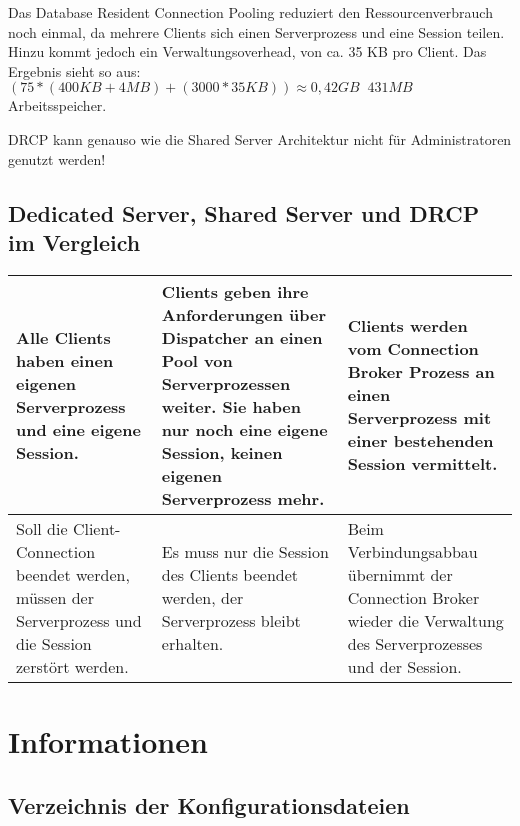           Das Database Resident Connection Pooling reduziert den Ressourcenverbrauch noch einmal, da mehrere Clients sich einen Serverprozess und eine Session teilen. Hinzu kommt jedoch ein Verwaltungsoverhead, von ca. 35 KB pro Client. Das Ergebnis sieht so aus: $(75 * (400 KB + 4 MB) + (3000 * 35 KB)) \approx 0,42 GB \mathop{\widehat{=}} 431 MB$ Arbeitsspeicher.

          \begin{merke}
            DRCP kann genauso wie die Shared Server Architektur nicht f\"ur Administratoren genutzt werden!
          \end{merke}

      \subsection{Dedicated Server, Shared Server und DRCP im Vergleich}
        \begin{center}
          \begin{small}
            \tabletail{
              \hline
            }
            \begin{supertabular}[h]{|p{4.9cm}|p{4.9cm}|p{4.9cm}|}
              Alle Clients haben einen eigenen Serverprozess und eine eigene Session.& Clients geben ihre Anforderungen \"uber Dispatcher an einen Pool von Serverprozessen weiter. Sie haben nur noch eine eigene Session, keinen eigenen Serverprozess mehr. & Clients werden vom Connection Broker Prozess an einen Serverprozess mit einer bestehenden Session vermittelt. \\
              \hline
              Soll die Client-Connection beendet werden, m\"ussen der Serverprozess und die Session zerst\"ort werden. & Es muss nur die Session des Clients beendet werden, der Serverprozess bleibt erhalten. & Beim Verbindungsabbau \"ubernimmt der Connection Broker wieder die Verwaltung des Serverprozesses und der Session. \\
              \hline
            \end{supertabular}
          \end{small}
        \end{center}
    \section{Informationen}
      \subsection{Verzeichnis der Konfigurationsdateien}
        \begin{literaturinternet}
          \item  \cite{NETRF011}
          \item  \cite{NETRF008}
          \item  \cite{NETRF007}
          \item  \cite{NETRF006}
        \end{literaturinternet}
\clearpage
